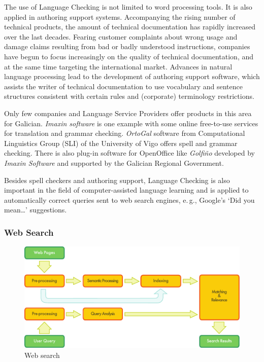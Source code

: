 \begin{multicols}{2}
The use of Language Checking is not limited to word processing tools. It is also applied in authoring support systems. Accompanying the rising number of technical products, the amount of technical documentation has rapidly increased over the last decades. Fearing customer complaints about wrong usage and damage claims resulting from bad or badly understood instructions, companies have begun to focus increasingly on the quality of technical documentation, and at the same time targeting the international market. Advances in natural language processing lead to the development of authoring support software, which assists the writer of technical documentation to use vocabulary and sentence structures consistent with certain rules and (corporate) terminology restrictions. 


Only few companies and Language Service Providers offer products in this area for Galician.  \textit{Imaxin software} \cite{GAL-Nota21} is one example with some online free-to-use services for translation and grammar checking. \textit{OrtoGal} software from Computational Linguistics Group (SLI) \cite{GAL-Nota22} of the University of Vigo offers spell and grammar checking. There is also plug-in software for OpenOffice like \textit{Golfiño} \cite{GAL-Nota23} developed by \textit{Imaxin Software} and supported by the Galician Regional Government.

Besides spell checkers and authoring support, Language Checking is also important in the field of computer-assisted language learning and is applied to automatically correct queries sent to web search engines, e.\,g., Google’s ‘Did you mean…’ suggestions. 

\subsubsection{Web Search}

\begin{figure}[htb]
  \center
  \includegraphics[width=\textwidth]{../_media/english/web_search_architecture}
  \caption{Web search}
  \label{fig:websearcharch_en}
 \end{figure}


\end{multicols}
